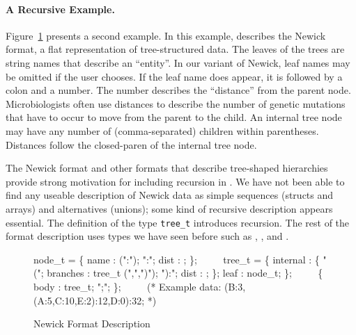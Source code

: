 \paragraph*{A Recursive \ipads{} Example.}
Figure~\ref{fig:ipads-newick} presents a second \ipads{} example.
In this example, \ipads{} describes the Newick format, a flat
representation of tree-structured data.  The leaves of the trees
are string names that describe an ``entity''.   In our variant of Newick, 
leaf names may be omitted if the user chooses.  If the leaf name does appear,
it is followed by a colon and a number.  The number describes the ``distance''
from the parent node.  Microbiologists often use
distances to describe the
number of genetic mutations that have to occur to move from the parent 
to the child.  An internal tree node may have any number of (comma-separated)
children within parentheses.  Distances follow the closed-paren
of the internal tree node.

The Newick format and other formats that describe tree-shaped 
hierarchies~\cite{geneontology,nexus}
provide strong motivation for including recursion in \ipads.  
We have not been able to find any useable description of Newick data as
simple sequences (structs and arrays) and alternatives (unions); some
kind of recursive description appears essential.
The definition of the type {\tt tree\_t} introduces recursion.
The rest of the format description uses types we have seen before such as
\Pstruct, \Parray{}, and \Punion.


\begin{figure}

\begin{code}
node\_t = \Popt \Pstruct \{
                name : \Pstring(":"); ":";
                dist : \Puint;  
              \};
\(\qquad\)
\Prec tree\_t =
  \Punion \{
    internal : 
      \Pstruct \{
        "(";
        branches : tree\_t \Parray(",",")");
        "):";
        dist : \Puint;
      \};
    leaf : node\_t;
  \};
\(\qquad\)
\Pstruct \{
  body : tree\_t;
  ";";
\};
\(\qquad\)
(* Example data:
   (B:3,(A:5,C:10,E:2):12,D:0):32;
*)

\end{code}
\caption{\ipads{} Newick Format Description}
\label{fig:ipads-newick}

\end{figure}

